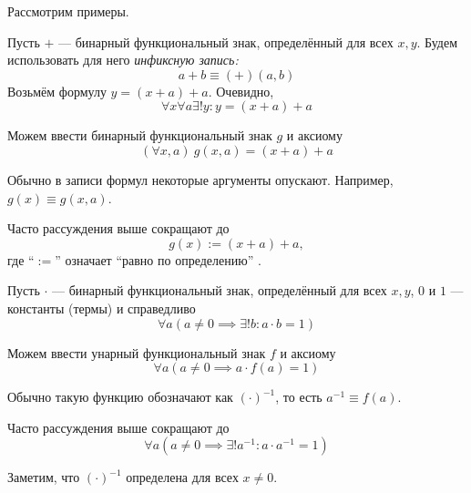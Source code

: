 Рассмотрим примеры.
\begin{fullwidth}
	\begin{multicols}{2}
		\raggedcolumns
		Пусть $+$ --- бинарный функциональный знак,
		определённый для всех $x,y$.
		Будем использовать для него {\it инфиксную запись:}
		\[
			a+b\equiv(+)(a,b)
		\]
		Возьмём формулу $y=(x+a)+a$. Очевидно,
		\[
			\forall x\forall a\exists !y:y=(x+a)+a
		\]

		Можем ввести бинарный функциональный знак $g$ и аксиому
		\[
			(\forall x,a)~g(x,a)=(x+a)+a
		\]

		Обычно в записи формул некоторые аргументы опускают.
		Например, $g(x)\equiv g(x,a)$.

		Часто рассуждения выше сокращают до
		\[
			g(x):=(x+a)+a,
		\]
		где ``$:=$'' означает ``равно по определению''
		.
		\columnbreak

		Пусть $\cdot$ --- бинарный функциональный знак,
		определённый для всех $x,y$,
		$0$ и $1$ --- константы (термы) и справедливо
		\[
			\forall a(a\neq 0\implies \exists !b:a\cdot b=1)
		\]

		Можем ввести унарный функциональный знак $f$ и аксиому
		\[
			\forall a(a\neq 0\implies a\cdot f(a)=1)
		\]

		Обычно такую функцию обозначают как $(\cdot)^{-1}$,
		то есть $a^{-1}\equiv f(a)$.

		Часто рассуждения выше сокращают до
		\[
			\forall a(a\neq 0\implies \exists !a^{-1}:a\cdot a^{-1}=1)
		\]

		Заметим, что $(\cdot)^{-1}$ определена для всех $x\neq 0$.
	\end{multicols}
\end{fullwidth}

\pagebreak
